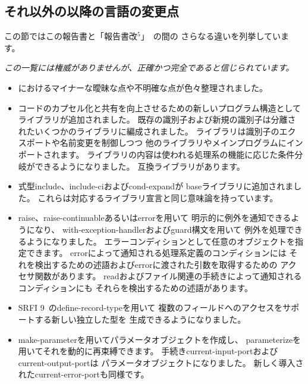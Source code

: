 \subsection*{それ以外の\rfivers{}以降の言語の変更点}
\label{differences}
この節ではこの報告書と「報告書改$^5$」~\cite{R5RS}の間の
さらなる違いを列挙しています。

{\em この一覧には権威がありませんが、正確かつ完全であると信じられています。}

\begin{itemize}

\item \rfivers{}におけるマイナーな曖昧な点や不明確な点が色々整理されました。

\item コードのカプセル化と共有を向上させるための新しいプログラム構造として
ライブラリが追加されました。
既存の識別子および新規の識別子は分離されたいくつかのライブラリに編成されました。
ライブラリは識別子のエクスポートや名前変更を制御しつつ
他のライブラリやメインプログラムにインポートされます。
ライブラリの内容は使われる処理系の機能に応じた条件分岐ができるようになりました。
\rfivers 互換ライブラリがあります。

\item 式型{\cf include}、{\cf include-ci}および{\cf cond-expand}が
baseライブラリに追加されました。
これらは対応するライブラリ宣言と同じ意味論を持っています。

\item {\cf raise}、{\cf raise-continuable}あるいは{\cf error}を用いて
明示的に例外を通知できるようになり、
{\cf with-\+exception-\+handler}および{\cf guard}構文を用いて
例外を処理できるようになりました。
エラーコンディションとして任意のオブジェクトを指定できます。
{\cf error}によって通知される処理系定義のコンディションには
それを検出するための述語および{\cf error}に渡された引数を取得するための
アクセサ関数があります。
{\cf read}およびファイル関連の手続きによって通知されるコンディションにも
それらを検出するための述語があります。

\item SRFI 9~\cite{srfi9}の{\cf define-record-type}を用いて
複数のフィールドへのアクセスをサポートする新しい独立した型を
生成できるようになりました。

\item {\cf make-parameter}を用いてパラメータオブジェクトを作成し、
{\cf parameterize}を用いてそれを動的に再束縛できます。
手続き{\cf current-\+input-\+port}および{\cf current-\+output-\+port}は
パラメータオブジェクトになりました。
新しく導入された{\cf current-\+error-\+port}も同様です。


\end{itemize}

